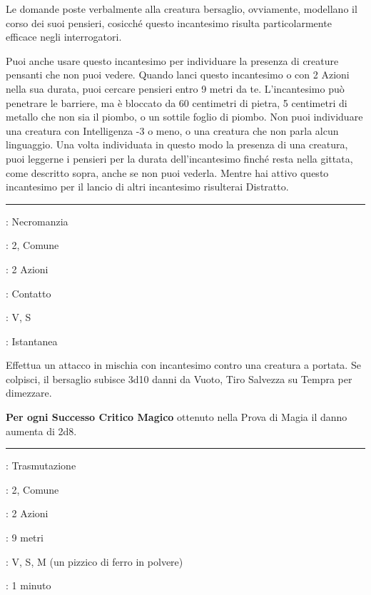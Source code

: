 \begin{multicols}{2}
Le domande poste verbalmente alla creatura bersaglio, ovviamente, modellano il corso dei suoi pensieri, cosicché questo incantesimo risulta particolarmente efficace negli interrogatori.

Puoi anche usare questo incantesimo per individuare la presenza di creature pensanti che non puoi vedere. Quando lanci questo incantesimo o con 2 Azioni nella sua durata, puoi cercare pensieri entro 9 metri da te. L'incantesimo può penetrare le barriere, ma è bloccato da 60 centimetri di pietra, 5 centimetri di metallo che non sia il piombo, o un sottile foglio di piombo. Non puoi individuare una creatura con Intelligenza -3 o meno, o una creatura che non parla alcun linguaggio. Una volta individuata in questo modo la presenza di una creatura, puoi leggerne i pensieri per la durata dell'incantesimo finché resta nella gittata, come descritto sopra, anche se non puoi vederla.
Mentre hai attivo questo incantesimo per il lancio di altri incantesimo risulterai Distratto.

\smallskip\noindent\rule{\linewidth}{2pt} \hypertarget{Infliggi Ferite}{}\medskip{}
\noindent
\begin{description}[noitemsep, topsep=0pt, parsep=0pt, partopsep=0pt, leftmargin=0cm, labelwidth=2.8cm]
	\item[\textbf{Lista di Magia}]: Necromanzia
	\item[\textbf{Livello}]: 2, Comune
	\item[\textbf{T. di Lancio}]: 2 Azioni
	\item[\textbf{Gittata}]: Contatto
	\item[\textbf{Componenti}]: V, S
	\item[\textbf{Durata}]: Istantanea
\end{description}

Effettua un attacco in mischia con incantesimo contro una creatura a portata. Se colpisci, il bersaglio subisce 3d10 danni da Vuoto, Tiro Salvezza su Tempra per dimezzare.

\textbf{Per ogni Successo Critico Magico} ottenuto nella Prova di Magia il danno aumenta di 2d8.

\smallskip\noindent\rule{\linewidth}{2pt} \hypertarget{Ingrandire/Ridurre}{}\medskip{}
\noindent
\begin{description}[noitemsep, topsep=0pt, parsep=0pt, partopsep=0pt, leftmargin=0cm, labelwidth=2.8cm]
	\item[\textbf{Lista di Magia}]: Trasmutazione
	\item[\textbf{Livello}]: 2, Comune
	\item[\textbf{T. di Lancio}]: 2 Azioni
	\item[\textbf{Gittata}]: 9 metri
	\item[\textbf{Componenti}]: V, S, M (un pizzico di ferro in polvere)
	\item[\textbf{Durata}]: 1 minuto
\end{description}


\end{multicols}
